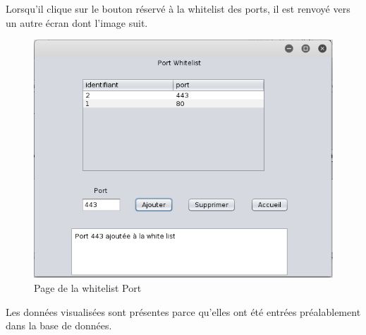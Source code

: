 				    Lorsqu'il clique sur le bouton réservé à la whitelist des ports, il est renvoyé vers un autre écran dont l'image suit.
				    \begin{figure}[H]
						\begin{center}
					    \includegraphics[scale=0.5]{images/portwhitelist.png}
					\end{center}
					\caption{Page de la whitelist Port}
					\label{Page de la whitelist Port}
				    \end{figure}
		Les données visualisées sont présentes parce qu'elles ont été entrées préalablement dans la base de données.
